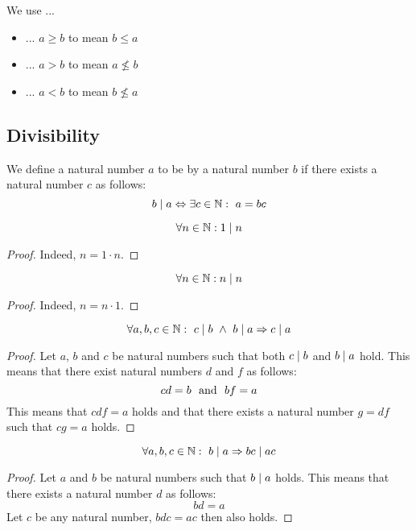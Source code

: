 \documentclass[main.tex]{subfiles}
\begin{document}
\begin{de}
  We use ...
  \begin{itemize}
    \item ... $a \ge b$ to mean $b \le a$
    \item ... $a > b$ to mean $a \not\le b$
    \item ... $a < b$ to mean $b \not\le a$
  \end{itemize}
\end{de}


\subsection{Divisibility}

\begin{de}
  We define a natural number $a$ to be  by a natural number $b$ if there exists a natural number $c$ as follows:
  \[ b \mid a \Leftrightarrow \exists c \in \mathbb{N}:\ a = bc \]
  
\end{de}

\begin{pr}
  \[
    \forall n \in \mathbb{N}: 1 \mid n
  \]

  \begin{proof}
    Indeed, $n = 1 \cdot n$.
  \end{proof}
\end{pr}

\begin{pr}
  \[
    \forall n \in \mathbb{N}: n \mid n
  \]

  \begin{proof}
    Indeed, $n = n \cdot 1$.
  \end{proof}
\end{pr}

\begin{pr}
  \[ \forall a, b, c \in \mathbb{N}:\ c \mid b \ \wedge\  b \mid a \Rightarrow c \mid a \]

  \begin{proof}
    Let $a$, $b$ and $c$ be natural numbers such that both $c \mid b$ and $b \mid a$ hold.
    This means that there exist natural numbers $d$ and $f$ as follows:
    \[ cd = b \ \text{ and }\  bf = a \]
    This means that $cdf = a$ holds and that there exists a natural number $g = df$ such that $cg = a$ holds.
  \end{proof}
\end{pr}

\begin{pr}
  \[ \forall a, b, c \in \mathbb{N}:\ b \mid a \Rightarrow bc \mid ac \]

  \begin{proof}
    Let $a$ and $b$ be natural numbers such that $b \mid a$ holds.
    This means that there exists a natural number $d$ as follows:
    \[ bd = a \]
    Let $c$ be any natural number, $bdc = ac$ then also holds.
  \end{proof}
\end{pr}
\end{document}
